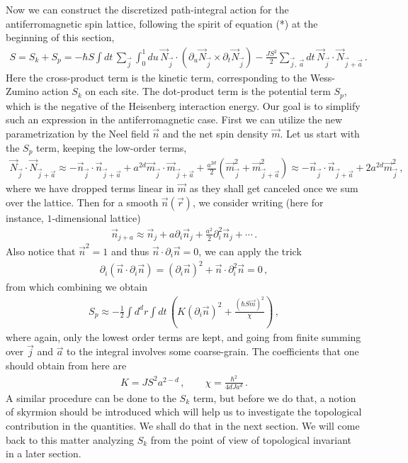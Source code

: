 \documentclass[11pt, onesided]{book}
\theoremstyle{break}
\theoremstyle{break}
\newcommand{\pd}{\partial}
\begin{document}
Now we can construct the discretized path-integral action for the antiferromagnetic spin lattice, following the spirit of equation (*) at the beginning of this section,
\begin{align*}
S = S_k + S_p = -\hbar S\int dt\,\sum_{\vec{j}}\int_0^1 du\, \vec{N}_{\vec{j}} \cdot \left( \pd_u \vec{N}_{\vec{j}}\times \pd_t \vec{N}_{\vec{j}}\right) - \frac{JS^2}{2}\sum_{\vec{j},\, \vec{a}}dt\, \vec{N}_{\vec{j}} \cdot \vec{N}_{\vec{j}+\vec{a}}\,.
\end{align*}
Here the cross-product term is the kinetic term, corresponding to the Wess-Zumino action $S_k$ on each site. The dot-product term is the potential term $S_p$, which is the negative of the Heisenberg interaction energy. Our goal is to simplify such an expression in the antiferromagnetic case. First we can utilize the new parametrization by the Neel field $\vec{n}$ and the net spin density $\vec{m}$. Let us start with the $S_p$ term, keeping the low-order terms,
\begin{align*}
\vec{N}_{\vec{j}} \cdot \vec{N}_{\vec{j}+\vec{a}} \approx - \vec{n}_{\vec{j}} \cdot \vec{n}_{\vec{j}+\vec{a}} + a^{2d}\vec{m}_{\vec{j}}\cdot \vec{m}_{\vec{j}+\vec{a}} + \frac{a^{2d}}{2}\left( \vec{m}_{\vec{j}}^2 + \vec{m}_{\vec{j}+\vec{a}}^2\right) \approx -\vec{n}_{\vec{j}} \cdot \vec{n}_{\vec{j}+\vec{a}} + 2a^{2d}\vec{m}_{\vec{j}}^2\,,
\end{align*}
where we have dropped terms linear in $\vec{m}$ as they shall get canceled once we sum over the lattice. Then for a smooth $\vec{n}(\vec{r})$, we consider writing (here for instance, $1$-dimensional lattice)
\begin{align*}
\vec{n}_{j+a} \approx \vec{n}_{j} + a\pd_i \vec{n}_{j} + \frac{a^2}{2}\pd_i^2 \vec{n}_j + \cdots\,.
\end{align*}
Also notice that $\vec{n}^2 = 1$ and thus $\vec{n}\cdot \pd_i \vec{n} = 0$, we can apply the trick 
\begin{align*}
\pd_i (\vec{n}\cdot \pd_i \vec{n}) = (\pd_i \vec{n})^2 + \vec{n}\cdot \pd_i^2 \vec{n} = 0\,,
\end{align*}
from which combining we obtain 
\begin{align*}
S_p \approx -\frac{1}{2}\int d^d r \int dt \,\left( K (\pd_i \vec{n})^2 + \frac{(\hbar S \vec{m})^2}{\chi}\right)\,,
\end{align*}
where again, only the lowest order terms are kept, and going from finite summing over $\vec{j}$ and $\vec{a}$ to the integral involves some coarse-grain. The coefficients that one should obtain from here are
\begin{align*}
K = JS^2 a^{2-d}\,,\qquad
\chi = \frac{\hbar^2}{4dJa^d}\,.
\end{align*}
A similar procedure can be done to the $S_k$ term, but before we do that, a notion of skyrmion should be introduced which will help us to investigate the topological contribution in the quantities. We shall do that in the next section. We will come back to this matter analyzing $S_k$ from the point of view of topological invariant in a later section. 
\end{document}
